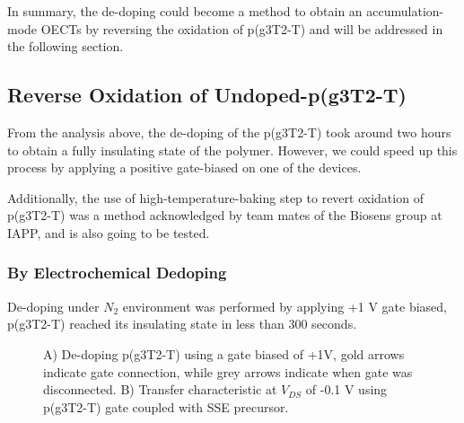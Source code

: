In summary, the de-doping could become a method to obtain an accumulation-mode OECTs by reversing the oxidation of p(g3T2-T) and will be addressed in the following section.

\subsection{Reverse Oxidation of Undoped-p(g3T2-T)}
From the analysis above, the de-doping of the p(g3T2-T) took around two hours to obtain a fully insulating state of the polymer. However, we could speed up this process by applying a positive gate-biased on one of the devices.

Additionally, the use of high-temperature-baking step to revert oxidation of p(g3T2-T) was a method acknowledged by team mates of the Biosens group at IAPP, and is also going to be tested.   

\subsubsection{By Electrochemical Dedoping}
De-doping under $N_{2}$ environment was performed by applying +1 V gate biased, p(g3T2-T) reached its insulating state in less than 300 seconds. 

\begin{figure}[ht]
    \centering
    \caption[Electrochemical de-doping of oxidized p(g3T2-T) OECT]{A) De-doping p(g3T2-T) using a gate biased of +1V, gold arrows indicate gate connection, while grey arrows indicate when gate was disconnected. B) Transfer characteristic at $V_{DS}$ of -0.1 V using p(g3T2-T) gate coupled with SSE precursor.}
    \label{fig:revox2}
\end{figure}

